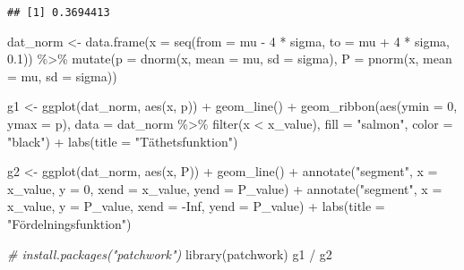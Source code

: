 \documentclass[
]{book}
\newenvironment{Shaded}{\begin{snugshade}}{\end{snugshade}}
\newcommand{\AttributeTok}[1]{\textcolor[rgb]{0.77,0.63,0.00}{#1}}
\newcommand{\CommentTok}[1]{\textcolor[rgb]{0.56,0.35,0.01}{\textit{#1}}}
\newcommand{\ConstantTok}[1]{\textcolor[rgb]{0.00,0.00,0.00}{#1}}
\newcommand{\DecValTok}[1]{\textcolor[rgb]{0.00,0.00,0.81}{#1}}
\newcommand{\FloatTok}[1]{\textcolor[rgb]{0.00,0.00,0.81}{#1}}
\newcommand{\FunctionTok}[1]{\textcolor[rgb]{0.00,0.00,0.00}{#1}}
\newcommand{\NormalTok}[1]{#1}
\newcommand{\OtherTok}[1]{\textcolor[rgb]{0.56,0.35,0.01}{#1}}
\newcommand{\SpecialCharTok}[1]{\textcolor[rgb]{0.00,0.00,0.00}{#1}}
\newcommand{\StringTok}[1]{\textcolor[rgb]{0.31,0.60,0.02}{#1}}
\theoremstyle{definition}
\theoremstyle{definition}
\theoremstyle{definition}
\theoremstyle{definition}
\theoremstyle{remark}
\begin{document}
\begin{verbatim}
## [1] 0.3694413
\end{verbatim}

\begin{Shaded}
\begin{Highlighting}[]
\NormalTok{dat\_norm }\OtherTok{\textless{}{-}} \FunctionTok{data.frame}\NormalTok{(}\AttributeTok{x =} \FunctionTok{seq}\NormalTok{(}\AttributeTok{from =}\NormalTok{ mu }\SpecialCharTok{{-}} \DecValTok{4} \SpecialCharTok{*}\NormalTok{ sigma, }\AttributeTok{to =}\NormalTok{ mu }\SpecialCharTok{+} \DecValTok{4} \SpecialCharTok{*}\NormalTok{ sigma, }\FloatTok{0.1}\NormalTok{)) }\SpecialCharTok{\%\textgreater{}\%} 
  \FunctionTok{mutate}\NormalTok{(}\AttributeTok{p =} \FunctionTok{dnorm}\NormalTok{(x, }\AttributeTok{mean =}\NormalTok{ mu, }\AttributeTok{sd =}\NormalTok{ sigma),}
         \AttributeTok{P =} \FunctionTok{pnorm}\NormalTok{(x, }\AttributeTok{mean =}\NormalTok{ mu, }\AttributeTok{sd =}\NormalTok{ sigma))}

\NormalTok{g1 }\OtherTok{\textless{}{-}} \FunctionTok{ggplot}\NormalTok{(dat\_norm, }\FunctionTok{aes}\NormalTok{(x, p)) }\SpecialCharTok{+}
  \FunctionTok{geom\_line}\NormalTok{() }\SpecialCharTok{+}
  \FunctionTok{geom\_ribbon}\NormalTok{(}\FunctionTok{aes}\NormalTok{(}\AttributeTok{ymin =} \DecValTok{0}\NormalTok{, }\AttributeTok{ymax =}\NormalTok{ p), }\AttributeTok{data =}\NormalTok{ dat\_norm }\SpecialCharTok{\%\textgreater{}\%} \FunctionTok{filter}\NormalTok{(x }\SpecialCharTok{\textless{}}\NormalTok{ x\_value), }\AttributeTok{fill =} \StringTok{"salmon"}\NormalTok{, }\AttributeTok{color =} \StringTok{"black"}\NormalTok{) }\SpecialCharTok{+}
  \FunctionTok{labs}\NormalTok{(}\AttributeTok{title =} \StringTok{"Täthetsfunktion"}\NormalTok{)}

\NormalTok{g2 }\OtherTok{\textless{}{-}} \FunctionTok{ggplot}\NormalTok{(dat\_norm, }\FunctionTok{aes}\NormalTok{(x, P)) }\SpecialCharTok{+}
  \FunctionTok{geom\_line}\NormalTok{() }\SpecialCharTok{+}
  \FunctionTok{annotate}\NormalTok{(}\StringTok{"segment"}\NormalTok{, }\AttributeTok{x =}\NormalTok{ x\_value, }\AttributeTok{y =} \DecValTok{0}\NormalTok{, }\AttributeTok{xend =}\NormalTok{ x\_value, }\AttributeTok{yend =}\NormalTok{ P\_value) }\SpecialCharTok{+}
  \FunctionTok{annotate}\NormalTok{(}\StringTok{"segment"}\NormalTok{, }\AttributeTok{x =}\NormalTok{ x\_value, }\AttributeTok{y =}\NormalTok{ P\_value, }\AttributeTok{xend =} \SpecialCharTok{{-}}\ConstantTok{Inf}\NormalTok{, }\AttributeTok{yend =}\NormalTok{ P\_value) }\SpecialCharTok{+}
  \FunctionTok{labs}\NormalTok{(}\AttributeTok{title =} \StringTok{"Fördelningsfunktion"}\NormalTok{)}

\CommentTok{\# install.packages("patchwork")}
\FunctionTok{library}\NormalTok{(patchwork)}
\NormalTok{g1 }\SpecialCharTok{/}\NormalTok{ g2}
\end{Highlighting}
\end{Shaded}
\end{document}
